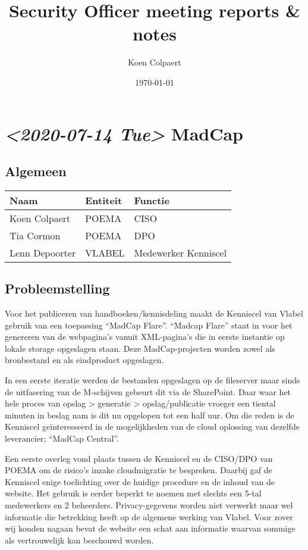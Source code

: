 \documentclass[11pt]{article}
\author{Koen Colpaert}
\date{\today}
\title{Security Officer meeting reports \& notes}
\begin{document}
\maketitle
\hypersetup{colorlinks=true,linkcolor=darkblue}
\newpage

\section{\textit{<2020-07-14 Tue> } MadCap}
\label{sec:orgb3ad8e6}

\subsection{Algemeen}
\label{sec:orgf148986}

\begin{center}
\begin{tabular}{lll}
Naam & Entiteit & Functie\\
\hline
Koen Colpaert & POEMA & CISO\\
Tia Cormon & POEMA & DPO\\
Lenn Depoorter & VLABEL & Medewerker Kenniscel\\
\end{tabular}
\end{center}

\subsection{Probleemstelling}
\label{sec:orgab12d2c}
Voor het publiceren van handboeken/kennisdeling maakt de Kenniscel van Vlabel gebruik van een toepassing 
``MadCap Flare''. ``Madcap Flare'' staat in voor het genereren van de webpagina's vanuit XML-pagina's die in eerste
instantie op lokale storage opgeslagen staan. Deze MadCap-projecten worden zowel als bronbestand en als eindproduct
opgeslagen. 

In een eerste iteratie werden de bestanden opgeslagen op de fileserver maar sinds de uitfasering van de M-schijven 
gebeurt dit via de SharePoint. Daar waar het hele proces van opslag > generatie > opslag/publicatie vroeger een tiental
minuten in beslag nam is dit nu opgelopen tot een half uur. Om die reden is de Kenniscel geïnteresseerd in de mogelijkheden
van de cloud oplossing van dezelfde leverancier; ``MadCap Central''.

Een eerste overleg vond plaats tussen de Kenniscel en de CISO/DPO van POEMA om de risico's inzake cloudmigratie te bespreken. 
Daarbij gaf de Kenniscel enige toelichting over de huidige procedure en de inhoud van de website. Het gebruik is eerder beperkt
te noemen met slechts een 5-tal medewerkers en 2 beheerders. 
Privacy-gegevens worden niet verwerkt maar wel informatie die betrekking heeft op de algemene werking van Vlabel. Voor zover wij
konden nagaan bevat de website een schat aan informatie waarvan sommige als vertrouwelijk kan beschouwd worden.
\end{document}
